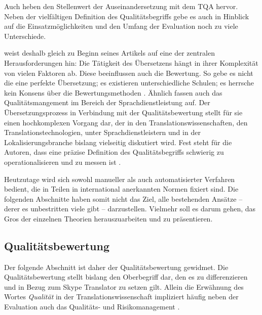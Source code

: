 Auch \citet[11]{moorkens_approaches_2018} heben den Stellenwert der Auseinandersetzung mit dem TQA hervor. Neben der vielfältigen Definition des Qualitätsbegriffs gebe es auch in Hinblick auf die Einsatzmöglichkeiten und den Umfang der Evaluation noch zu viele Unterschiede.

\citet[230]{martin_martin_sobre_2010} weist deshalb gleich zu Beginn seines Artikels auf eine der zentralen Herausforderungen hin: Die Tätigkeit des Übersetzens hängt in ihrer Komplexität von vielen Faktoren ab. Diese beeinflussen auch die Bewertung. So gebe es nicht die eine perfekte Übersetzung; es existieren unterschiedliche Schulen; es herrsche kein Konsens über die Bewertungsmethoden \citep[230]{martin_martin_sobre_2010}. Ähnlich fassen auch \citeauthor{moorkens_translation_2018} das Qualitätsmangement im Bereich der Sprachdienstleistung auf. Der Übersetzungsprozess in Verbindung mit der Qualitätsbewertung stellt für sie einen hochkomplexen Vorgang dar, der in den Translationswissenschaften, den Translationstechnologien, unter Sprachdienstleistern und in der Lokalisierungsbranche bislang vielseitig diskutiert wird. Fest steht für die Autoren, dass eine präzise Definition des Qualitätsbegriffs schwierig zu operationalisieren und zu messen ist \citep[2]{moorkens_translation_2018}.

Heutzutage wird sich sowohl manueller als auch automatisierter Verfahren bedient, die in Teilen in international anerkannten Normen fixiert sind. Die folgenden Abschnitte haben somit nicht das Ziel, alle bestehenden Ansätze -- derer es unbestritten viele gibt -- darzustellen. Vielmehr soll es darum gehen, das Gros der einzelnen Theorien herauszuarbeiten und zu präsentieren.


\subsection{Qualitätsbewertung}
\label{K3:subsec:Qualitaetsbewertung}


Der folgende Abschnitt ist daher der Qualitätsbewertung gewidmet. Die Qualitätsbewertung stellt bislang den Oberbegriff dar, den es zu differenzieren und in Bezug zum Skype Translator zu setzen gilt. Allein die Erwähnung des Wortes \emph{Qualität} in der Translationswissenschaft impliziert häufig neben der Evaluation auch das Qualitäts- und Risikomanagement .

